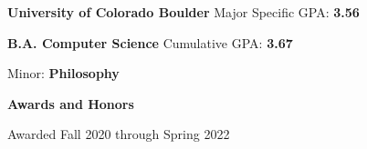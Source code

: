 \begin{divider}[Education]

  {\textbf{University of Colorado Boulder}} \hfill {Major Specific GPA: \textbf{3.56}}

  \vspace{.5mm}

  {\quad \textbf{B.A. Computer Science}} \hfill {Cumulative GPA: \textbf{3.67}}

  {\quad \hspace{3mm} Minor: \textbf{Philosophy}} 

  {\vspace{2mm}}

  {\quad \textbf{Awards and Honors}}

  {\vspace{-4.3mm}}

  \begin{ul}
      \hfill Awarded Fall 2020 through Spring 2022
  \end{ul}
\end{divider}


